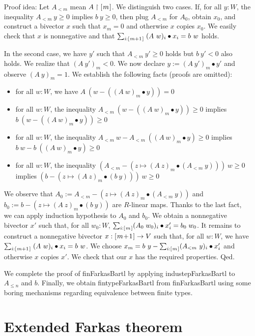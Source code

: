 \documentclass[]{article}
\renewcommand{\.}{\hskip .75pt}
\newcommand{\fin}[1]{[\.#1\.]}
\let\r=\rightarrow
\begin{document}
\medskip \noindent
Proof idea:
Let $A_{<m}$ mean $A \restriction \fin{m}$.
We distinguish two cases. If, for all $y : W$, the inequality
$A_{<m}~y \ge 0$ implies $b~y \ge 0$, then plug $A_{<m}$
for $A_0$, obtain $x_0$, and construct a bivector $x$ such that
$x_m = 0$ and otherwise $x$ copies $x_0$. We easily check that
$x$ is nonnegative and that
$ \sum_{i : \fin{m+1}}\; (A~w)_i \bullet x_i = b~w $ holds.

In the second case, we have $y'$ such that $A_{<m}~y' \ge 0$
holds but $b~y' < 0$ also holds. We realize that $(A~y')_m < 0$.
We now declare $y := (A~y')_m \bullet y'$ and observe
$(A~y)_m = 1$. We establish the following facts (proofs are omitted):
\begin{itemize}
\item for all $w : W$, we have $A~(w - ((A~w)_m \bullet y)) = 0$
\item for all $w : W$, the inequality $A_{<m}~(w - ((A~w)_m \bullet y)) \ge 0$
implies $b~(w - ((A~w)_m \bullet y)) \ge 0$
\item for all $w : W$, the inequality $A_{<m}~w - A_{<m}~((A~w)_m \bullet y) \ge 0$
implies $b~w - b~((A~w)_m \bullet y) \ge 0$
\item for all $w : W$, the inequality $(A_{<m} - (z \mapsto (A~z)_m \bullet (A_{<m}~y)))~w \ge 0$
implies $(b - (z \mapsto (A~z)_m \bullet (b~y)))~w \ge 0$
\end{itemize}
We observe that
$A_0 := A_{<m} - (z \mapsto (A~z)_m \bullet (A_{<m}~y))$
and
$b_0 := b - (z \mapsto (A~z)_m \bullet (b~y))$
are $R$-linear maps.
Thanks to the last fact, we can apply induction hypothesis to $A_0$ and $b_0$.
We obtain a nonnegative bivector $x'$ such that,
for all $w_0 : W$, $ \sum_{i : \fin{m}} (A_0\;w_0)_i \bullet x'_i = b_0\;w_0 $.
It remains to construct a nonnegative bivector $x : \fin{m\!+\!1} \r V$
such that, for all $w : W$, we have
$ \sum_{i : \fin{m+1}}\; (A~w)_i \bullet x_i = b~w $.
We choose $x_m = b~y - \sum_{i : \fin{m}} (A_{<m}~y)_i \bullet x'_i$
and otherwise $x$ copies $x'$. We check that our $x$ has the required
properties. Qed.

\medskip
We complete the proof of finFarkasBartl by applying industepFarkasBartl
to $A_{\le n}$ and $b$. Finally, we obtain fintypeFarkasBartl from
finFarkasBartl using some boring mechanisms regarding equivalence between
finite types.


\section {Extended Farkas theorem}
\end{document}
